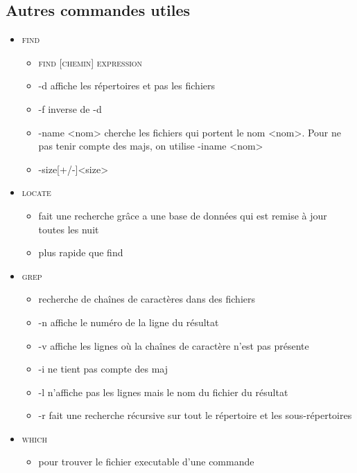 \documentclass[a4paper]{article}
\begin{document}
    \subsection{Autres commandes utiles}
    \begin{itemize}[label=\textbullet, font=\large]
      \item \textsc{find}
      \begin{itemize}[label=, font=\scriptsize]
        \item \textsc{find [chemin] expression}
        \item -d affiche les répertoires et pas les fichiers
        \item -f inverse de -d
        \item -name <nom> cherche les fichiers qui portent le nom <nom>. Pour ne pas tenir compte des majs, on utilise -iname <nom>
        \item -size[+/-]<size>
      \end{itemize}
      \item \textsc{locate}
      \begin{itemize}[label=, font=\scriptsize]
        \item fait une recherche grâce a une base de données qui est remise à jour toutes les nuit
        \item plus rapide que find
      \end{itemize}
      \item \textsc{grep}
      \begin{itemize}[label=, font=\scriptsize]
        \item recherche de chaînes de caractères dans des fichiers
        \item -n affiche le numéro de la ligne du résultat
        \item -v affiche les lignes où la chaînes de caractère n'est pas présente
        \item -i ne tient pas compte des maj
        \item -l n'affiche pas les lignes mais le nom du fichier du résultat
        \item -r fait une recherche récursive sur tout le répertoire et les sous-répertoires
      \end{itemize}
      \item \textsc{which}
      \begin{itemize}[label=, font=\scriptsize]
        \item pour trouver le fichier executable d'une commande

\end{itemize}
\end{itemize}
\end{document}
